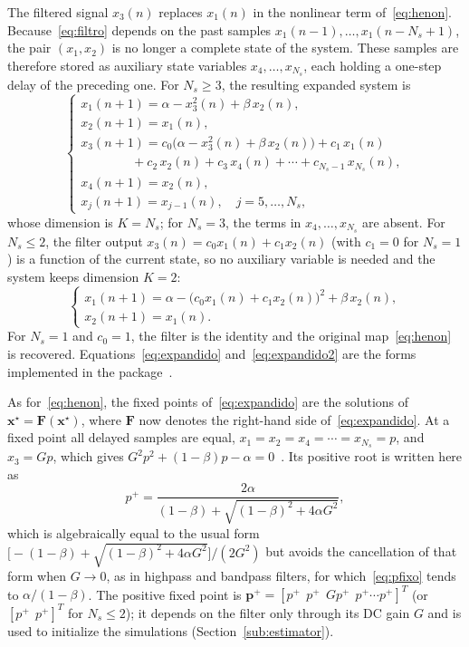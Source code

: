 \documentclass[journal]{IEEEtran}
\begin{document}
The filtered signal $x_3(n)$ replaces $x_1(n)$ in the nonlinear term
of~\eqref{eq:henon}. Because~\eqref{eq:filtro} depends on the past samples
$x_1(n-1),\ldots,x_1(n-N_s+1)$, the pair $(x_1,x_2)$ is no longer a complete
state of the system. These samples are therefore stored as auxiliary state
variables $x_4,\ldots,x_{N_s}$, each holding a one-step delay of the
preceding one. For $N_s\ge3$, the resulting expanded system
is~\cite{Borges2022sbrt,BorgesCNSNS2024}
\begin{equation}
  \begin{cases}
    x_1(n+1) = \alpha - x_3^2(n) + \beta\, x_2(n), \\
    x_2(n+1) = x_1(n), \\
    x_3(n+1) = c_0\bigl(\alpha - x_3^2(n) + \beta\, x_2(n)\bigr) + c_1\, x_1(n) \\
    \qquad\qquad + c_2\, x_2(n) + c_3\, x_4(n) + \cdots + c_{N_s-1}\, x_{N_s}(n), \\
    x_4(n+1) = x_2(n), \\
    x_j(n+1) = x_{j-1}(n),\quad j = 5,\ldots,N_s,
  \end{cases}
  \label{eq:expandido}
\end{equation}
whose dimension is $K=N_s$; for $N_s=3$, the terms in $x_4,\ldots,x_{N_s}$
are absent. For $N_s\le2$, the filter output $x_3(n)=c_0x_1(n)+c_1x_2(n)$ (with
$c_1=0$ for $N_s=1$) is a function of the current state, so no auxiliary
variable is needed and the system keeps dimension $K=2$:
\begin{equation}
  \begin{cases}
    x_1(n+1) = \alpha - \bigl(c_0x_1(n)+c_1x_2(n)\bigr)^2 + \beta\, x_2(n), \\
    x_2(n+1) = x_1(n).
  \end{cases}
  \label{eq:expandido2}
\end{equation}
For $N_s=1$ and $c_0=1$, the filter is the identity and the original
map~\eqref{eq:henon} is recovered. Equations~\eqref{eq:expandido}
and~\eqref{eq:expandido2} are the forms implemented in the
package~\cite{chaoticPFC2026}.

As for~\eqref{eq:henon}, the fixed points of~\eqref{eq:expandido} are the
solutions of $\mathbf{x}^\star=\mathbf{F}(\mathbf{x}^\star)$, where
$\mathbf{F}$ now denotes the right-hand side of~\eqref{eq:expandido}. At a
fixed point all delayed samples are equal, $x_1=x_2=x_4=\cdots=x_{N_s}=p$, and
$x_3=Gp$, which gives $G^2p^2+(1-\beta)p-\alpha=0$~\cite{BorgesCNSNS2024,BorgesTese2026}.
Its positive root is written here as
\begin{equation}
  p^{+} = \frac{2\alpha}{(1-\beta)+\sqrt{(1-\beta)^2+4\alpha G^2}},
  \label{eq:pfixo}
\end{equation}
which is algebraically equal to the usual form
$\bigl[-(1-\beta)+\sqrt{(1-\beta)^2+4\alpha G^2}\bigr]/(2G^2)$ but avoids the
cancellation of that form when $G\to0$, as in highpass and bandpass filters,
for which~\eqref{eq:pfixo} tends to $\alpha/(1-\beta)$. The positive fixed
point is $\mathbf{p}^+=[p^+\;\,p^+\;\,Gp^+\;\,p^+\cdots p^+]^T$ (or
$[p^+\;\,p^+]^T$ for $N_s\le2$); it depends on the filter only through its DC
gain $G$ and is used to initialize the simulations
(Section~\ref{sub:estimator}).
\end{document}
